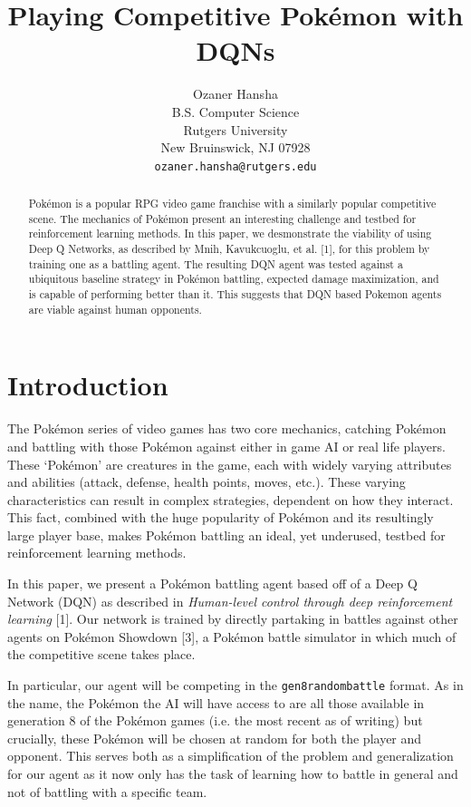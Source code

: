 \documentclass{article}
\title{Playing Competitive Pokémon with DQNs}
\author{%
  Ozaner Hansha \\
  B.S. Computer Science\\
  Rutgers University\\
  New Bruinswick, NJ 07928 \\
  \texttt{ozaner.hansha@rutgers.edu} \\
}
\begin{document}
\maketitle

\begin{abstract}
  Pokémon is a popular RPG video game franchise with a similarly popular competitive scene. The mechanics of Pokémon present an interesting challenge and testbed for reinforcement learning methods. In this paper, we desmonstrate the viability of using Deep Q Networks, as described by Mnih, Kavukcuoglu, et al. [1], for this problem by training one as a battling agent. The resulting DQN agent was tested against a ubiquitous baseline strategy in Pokémon battling, expected damage maximization, and is capable of performing better than it. This suggests that DQN based Pokemon agents are viable against human opponents.
\end{abstract}

\section{Introduction}
The Pokémon series of video games has two core mechanics, catching Pokémon and battling with those Pokémon against either in game AI or real life players. These `Pokémon' are creatures in the game, each with widely varying attributes and abilities (attack, defense, health points, moves, etc.). These varying characteristics can result in complex strategies, dependent on how they interact. This fact, combined with the huge popularity of Pokémon and its resultingly large player base, makes Pokémon battling an ideal, yet underused, testbed for reinforcement learning methods.

In this paper, we present a Pokémon battling agent based off of a Deep Q Network (DQN) as described in \textit{Human-level control through deep reinforcement learning} [1]. Our network is trained by directly partaking in battles against other agents on Pokémon Showdown [3], a Pokémon battle simulator in which much of the competitive scene takes place.

In particular, our agent will be competing in the \texttt{gen8randombattle} format. As in the name, the Pokémon the AI will have access to are all those available in generation 8 of the Pokémon games (i.e. the most recent as of writing) but crucially, these Pokémon will be chosen at random for both the player and opponent. This serves both as a simplification of the problem and generalization for our agent as it now only has the task of learning how to battle in general and not of battling with a specific team.
\end{document}

